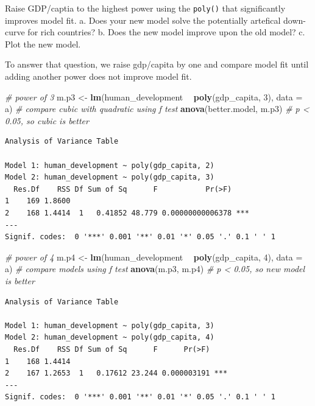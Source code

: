 \documentclass[]{article}
\newenvironment{Shaded}{\begin{snugshade}}{\end{snugshade}}
\newcommand{\KeywordTok}[1]{\textcolor[rgb]{0.13,0.29,0.53}{\textbf{#1}}}
\newcommand{\DataTypeTok}[1]{\textcolor[rgb]{0.13,0.29,0.53}{#1}}
\newcommand{\DecValTok}[1]{\textcolor[rgb]{0.00,0.00,0.81}{#1}}
\newcommand{\StringTok}[1]{\textcolor[rgb]{0.31,0.60,0.02}{#1}}
\newcommand{\CommentTok}[1]{\textcolor[rgb]{0.56,0.35,0.01}{\textit{#1}}}
\newcommand{\OperatorTok}[1]{\textcolor[rgb]{0.81,0.36,0.00}{\textbf{#1}}}
\newcommand{\NormalTok}[1]{#1}
\theoremstyle{definition}
\theoremstyle{definition}
\theoremstyle{definition}
\theoremstyle{remark}
\begin{document}
Raise GDP/captia to the highest power using the \texttt{poly()} that
significantly improves model fit. a. Does your new model solve the
potentially artefical down-curve for rich countries? b. Does the new
model improve upon the old model? c. Plot the new model.

To answer that question, we raise gdp/capita by one and compare model
fit until adding another power does not improve model fit.

\begin{Shaded}
\begin{Highlighting}[]
\CommentTok{# power of 3}
\NormalTok{m.p3 <-}\StringTok{ }\KeywordTok{lm}\NormalTok{(human_development }\OperatorTok{~}\StringTok{ }\KeywordTok{poly}\NormalTok{(gdp_capita, }\DecValTok{3}\NormalTok{), }\DataTypeTok{data =}\NormalTok{ a)}
\CommentTok{# compare cubic with quadratic using f test}
\KeywordTok{anova}\NormalTok{(better.model, m.p3) }\CommentTok{# p < 0.05, so cubic is better}
\end{Highlighting}
\end{Shaded}

\begin{verbatim}
Analysis of Variance Table

Model 1: human_development ~ poly(gdp_capita, 2)
Model 2: human_development ~ poly(gdp_capita, 3)
  Res.Df    RSS Df Sum of Sq      F           Pr(>F)    
1    169 1.8600                                         
2    168 1.4414  1   0.41852 48.779 0.00000000006378 ***
---
Signif. codes:  0 '***' 0.001 '**' 0.01 '*' 0.05 '.' 0.1 ' ' 1
\end{verbatim}

\begin{Shaded}
\begin{Highlighting}[]
\CommentTok{# power of 4}
\NormalTok{m.p4 <-}\StringTok{ }\KeywordTok{lm}\NormalTok{(human_development }\OperatorTok{~}\StringTok{ }\KeywordTok{poly}\NormalTok{(gdp_capita, }\DecValTok{4}\NormalTok{), }\DataTypeTok{data =}\NormalTok{ a)}
\CommentTok{# compare models using f test}
\KeywordTok{anova}\NormalTok{(m.p3, m.p4) }\CommentTok{# p < 0.05, so new model is better}
\end{Highlighting}
\end{Shaded}

\begin{verbatim}
Analysis of Variance Table

Model 1: human_development ~ poly(gdp_capita, 3)
Model 2: human_development ~ poly(gdp_capita, 4)
  Res.Df    RSS Df Sum of Sq      F      Pr(>F)    
1    168 1.4414                                    
2    167 1.2653  1   0.17612 23.244 0.000003191 ***
---
Signif. codes:  0 '***' 0.001 '**' 0.01 '*' 0.05 '.' 0.1 ' ' 1
\end{verbatim}
\end{document}

